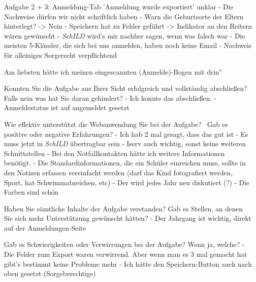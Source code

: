 Aufgabe 2 + 3:
Anmeldung-Tab 'Anmeldung wurde exportiert' unklar
- Die Nachweise dürfen wir nicht schriftlich haben
- Warn die Geburtsorte der Eltern hinterlegt? -> Nein
- Speichern hat zu Fehler geführt -> Indikator an den Reitern wären gewünscht
- \textit{SchILD} wird's mir nachher sagen, wenn was falsch war
- Die meisten 5-Klässler, die sich bei uns anmelden, haben noch keine Email
- Nachweis für alleiniges Sorgerecht verpflichtend

Am liebsten hätte ich meinen eingescannten (Anmelde)-Bogen mit drin"		



Konnten Sie die Aufgabe aus Ihrer Sicht erfolgreich und vollständig abschließen? Falls nein was hat Sie daran gehindert?
- Ich konnte das abschließen.		
- Anmeldestatus ist auf angemeldet gesetzt 	



















Wie effektiv unterstützt die Webanwendung Sie bei der Aufgabe?  Gab es positive oder negative Erfahrungen?	
- Ich hab 2 mal gesagt, dass das gut ist
- Es muss jetzt in \textit{SchILD} übertragbar sein
- Iserv auch wichtig, sonst keine weiteren Schnittstellen
- Bei den Notfallkontakten hätte ich weitere Informationen benötigt.
- Die Standardinformationen, die ein Schüler einreichen muss, sollte in den Notizen erfassen vereinfacht werden (darf das Kind fotografiert werden, Sport, hat Schwimmabzeichen, etc)
- Der wird jedes Jahr neu diskutiert (?)
- Die Farben sind schön			





Haben Sie sämtliche Inhalte der Aufgabe verstanden? Gab es Stellen, an denen Sie sich mehr Unterstützung gewünscht hätten?			
- Der Jahrgang ist wichtig, direkt auf der Anmeldungen-Seite	

Gab es Schwierigkeiten oder Verwirrungen bei der Aufgabe? Wenn ja, welche?	
- Die Felder zum Export waren verwirrend. Aber wenn man es 3 mal gemacht hat gibt's bestimmt keine Probleme mehr
- Ich hätte den Speichern-Button auch nach oben gesetzt (Sorgeberechtige)			











